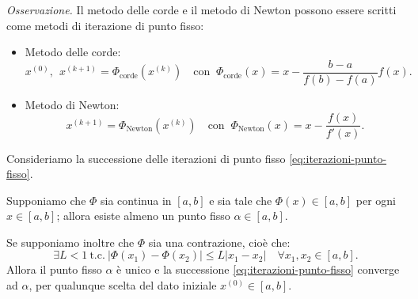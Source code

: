 \textit{Osservazione.}
Il metodo delle corde e il metodo di Newton possono essere scritti come metodi di iterazione di punto fisso:
\begin{itemize}
\item Metodo delle corde:
\begin{equation*}
x^{(0)} ,\ \ x^{(k+1)} =\Phi _{\text{corde}}\left( x^{(k)}\right) \quad \text{con } \ \Phi _{\text{corde}}(x) =x-\frac{b-a}{f(b)-f(a)} f(x).
\end{equation*}
\item Metodo di Newton:
\begin{equation*}
x^{(k+1)} =\Phi _{\text{Newton}}\left( x^{(k)}\right) \quad \text{con  } \ \Phi _{\text{Newton}}(x) =x-\frac{f(x)}{f'(x)}.
\end{equation*}
\end{itemize}
\begin{theorem}
Consideriamo la successione delle iterazioni di punto fisso \eqref{eq:iterazioni-punto-fisso}.

Supponiamo che $\Phi $ sia continua in $[ a,b]$ e sia tale che $\Phi (x) \in [ a,b]$ per ogni $x\in [ a,b]$; allora esiste almeno un punto fisso $\alpha \in [ a,b]$.

Se supponiamo inoltre che $\Phi $ sia una contrazione, cioè che:
\begin{equation*}
\exists L< 1\ \text{t.c.} \ | \Phi ( x_{1}) -\Phi ( x_{2})| \leq L| x_{1} -x_{2}| \quad \forall x_{1} ,x_{2} \in [a,b].
\end{equation*}
Allora il punto fisso $\alpha$ è unico e la successione \eqref{eq:iterazioni-punto-fisso} converge ad $\alpha $, per qualunque scelta del dato iniziale $x^{(0)} \in [ a,b]$.
\end{theorem}

